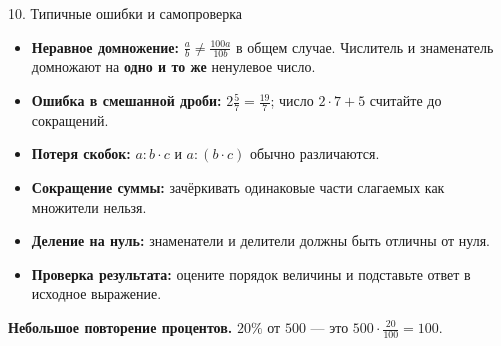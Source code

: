 \documentclass[a4paper,12pt]{article}
\newcommand{\sectionhead}[1]{%
  \needspace{4\baselineskip}
  \vspace{0.9\baselineskip}
  {\large\color{darkaccent}#1\par}
  \vspace{2pt}{\color{accent}\hrule height .5pt}\vspace{6pt}
}
\begin{document}
\sectionhead{10. Типичные ошибки и самопроверка}
\begin{itemize}[label=\textcolor{accent}{$\blacktriangleright$},leftmargin=6mm]
\item \textbf{Неравное домножение:} $\frac ab\ne\frac{100a}{10b}$ в общем случае. Числитель и знаменатель домножают на \textbf{одно и то же} ненулевое число.
\item \textbf{Ошибка в смешанной дроби:} $2\frac57=\frac{19}{7}$; число $2\cdot7+5$ считайте до сокращений.
\item \textbf{Потеря скобок:} $a:b\cdot c$ и $a:(b\cdot c)$ обычно различаются.
\item \textbf{Сокращение суммы:} зачёркивать одинаковые части слагаемых как множители нельзя.
\item \textbf{Деление на нуль:} знаменатели и делители должны быть отличны от нуля.
\item \textbf{Проверка результата:} оцените порядок величины и подставьте ответ в исходное выражение.
\end{itemize}
\vspace{2pt}
\textcolor{darkaccent}{\textbf{Небольшое повторение процентов.}}
$20\%$ от $500$ --- это $500\cdot\frac{20}{100}=100$.
\end{document}
